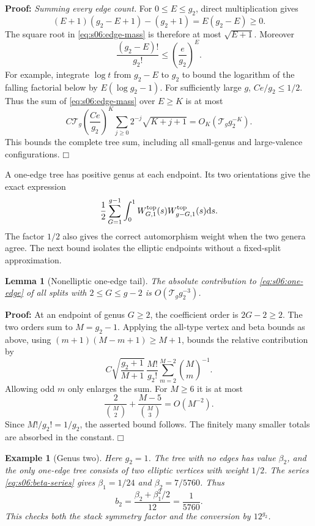 \documentclass[a4paper,10pt]{article}
\numberwithin{equation}{section}
\newcommand{\dd}{\mathrm{d}}
\theoremstyle{paperplain}
\newtheorem{lmm}[thm]{Lemma}
\theoremstyle{paperremark}
\newtheorem{exm}{Example}[section]
\theoremstyle{paperplain}
\newenvironment{prf}{\noindent \textbf{Proof: }}{\hfill $\mdlgwhtsquare$\par\addvspace{0.5\baselineskip}}
\begin{document}
\begin{prf}
\emph{Summing every edge count.}
For $0\leq E\leq g_2$, direct multiplication gives
\[
 (E+1)(g_2-E+1)-(g_2+1)=E(g_2-E)\geq0.
\]
The square root in \eqref{eq:s06:edge-mass} is therefore at most
$\sqrt{E+1}$. Moreover
\[
 \frac{(g_2-E)!}{g_2!}\leq\left(\frac e{g_2}\right)^E.
\]
For example, integrate $\log t$ from $g_2-E$ to $g_2$ to bound
the logarithm of the falling factorial below by
$E(\log g_2-1)$. For sufficiently large $g$, $Ce/g_2\leq1/2$.
Thus the sum of \eqref{eq:s06:edge-mass} over $E\geq K$ is at most
\[
 C\mathcal T_g\left(\frac{Ce}{g_2}\right)^K
       \sum_{j\geq0}2^{-j}\sqrt{K+j+1}
 =O_K(\mathcal T_g g_2^{-K}).
\]
This bounds the complete tree sum, including all small-genus and
large-valence configurations.
\end{prf}

A one-edge tree has positive genus at each endpoint. Its two
orientations give the exact expression
\begin{equation}\label{eq:s06:one-edge}
 \frac12\sum_{G=1}^{g-1}\int_0^1
       W^{\rm top}_{G,1}(s)W^{\rm top}_{g-G,1}(s)\dd s.
\end{equation}
The factor $1/2$ also gives the correct automorphism weight when the
two genera agree. The next bound isolates the elliptic endpoints
without a fixed-split approximation.

\begin{lmm}[Nonelliptic one-edge tail]\label{lmm:s06:nonelliptic-tail}
The absolute contribution to \eqref{eq:s06:one-edge} of all splits
with $2\leq G\leq g-2$ is $O(\mathcal T_g g_2^{-3})$.
\end{lmm}
\begin{prf}
At an endpoint of genus $G\geq2$, the coefficient order is
$2G-2\geq2$. The two orders sum to $M=g_2-1$.
Applying the all-type vertex and beta bounds as above, using
$(m+1)(M-m+1)\geq M+1$, bounds the relative contribution by
\[
 C\sqrt{\frac{g_2+1}{M+1}}\,
       \frac{M!}{g_2!}
       \sum_{m=2}^{M-2}\binom{M}{m}^{-1}.
\]
Allowing odd $m$ only enlarges the sum. For $M\geq6$ it is at most
\[
 \frac2{\binom M2}+\frac{M-5}{\binom M3}=O(M^{-2}).
\]
Since $M!/g_2!=1/g_2$, the asserted bound follows. The finitely
many smaller totals are absorbed in the constant.
\end{prf}

\begin{exm}[Genus two]
Here $g_2=1$. The tree with no edges has value $\beta_2$, and the only
one-edge tree consists of two elliptic vertices with weight $1/2$.
The series \eqref{eq:s06:beta-series} gives
$\beta_1=1/24$ and $\beta_2=7/5760$. Thus
\[
 b_2=\frac{\beta_2+\beta_1^2/2}{12}=\frac1{5760}.
\]
This checks both the stack symmetry factor and the conversion by
$12^{g_2}$.
\end{exm}
\end{document}
